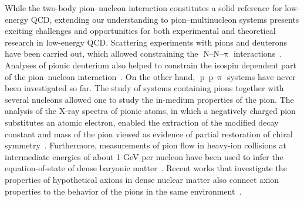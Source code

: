\documentclass[ALICE,manyauthors]{cernphprep}
\begin{document}
While the two-body pion--nucleon interaction constitutes a solid reference for low-energy QCD, extending our understanding to pion--multinucleon systems presents exciting challenges and opportunities for both experimental and theoretical research in low-energy QCD. Scattering experiments with pions and deuterons have been carried out, which allowed constraining the $\text{N--N--}\uppi$ interactions~\cite{Brueckner:1953zza,Baru:2012iv}. Analyses of pionic deuterium also helped to constrain the isospin dependent part of the pion--nucleon interaction~\cite{Strauch:2010vu,DORING2005673}. On the other hand, $\text{p--p--}\uppi$ systems have never been investigated so far.
The study of systems containing pions together with several nucleons allowed one to study the in-medium  properties of the pion. The analysis of the X-ray spectra of pionic atoms, in which a negatively charged pion substitutes an atomic electron, enabled the extraction of the modified decay constant and mass of the pion viewed as evidence of partial restoration of chiral symmetry~\cite{Suzuki:2002ae,piAF:2022gvw}. Furthermore, measurements of pion flow in heavy-ion collisions at intermediate energies of about 1 GeV per nucleon have been used to infer the equation-of-state of dense baryonic matter~\cite{FOPI:2006ifg, Li:2005gfa}.
Recent works that investigate the properties of hypothetical axions in dense nuclear matter also connect axion properties to the behavior of the pions in the same environment~\cite{Balkin:2020dsr}.
\end{document}
